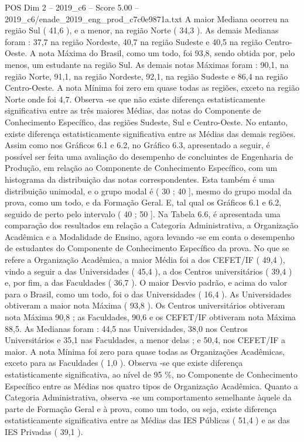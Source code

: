 \begin{textsample}{POS Dim 2 – 2019\_c6 – Score 5.00 – 2019\_c6/enade\_2019\_eng\_prod\_c7c0e9871a.txt}
A maior Mediana ocorreu na região Sul ( 41,6 ), e a menor, na região Norte ( 34,3 ).
As demais Medianas foram : 37,7 na região Nordeste, 40,7 na região Sudeste e 40,5 na região Centro-Oeste.
A nota Máxima do Brasil, como um todo, foi 93,8, sendo obtida por, pelo menos, um estudante na região Sul.
As demais notas Máximas foram : 90,1, na região Norte, 91,1, na região Nordeste, 92,1, na região Sudeste e 86,4 na região Centro-Oeste.
A nota Mínima foi zero em quase todas as regiões, exceto na região Norte onde foi 4,7.
Observa -se que não existe diferença estatisticamente significativa entre as três maiores Médias, das notas do Componente de Conhecimento Específico, das regiões Sudeste, Sul e Centro-Oeste.
No entanto, existe diferença estatisticamente significativa entre as Médias das demais regiões.
Assim como nos Gráficos 6.1 e 6.2, no Gráfico 6.3, apresentado a seguir, é possível ser feita uma avaliação do desempenho de concluintes de Engenharia de Produção, em relação ao Componente de Conhecimento Específico, com um histograma da distribuição das notas correspondentes.
Esta também é uma distribuição unimodal, e o grupo modal é ( 30 ; 40 ], mesmo do grupo modal da prova, como um todo, e da Formação Geral.
E, tal qual os Gráficos 6.1 e 6.2, seguido de perto pelo intervalo ( 40 ; 50 ].
Na Tabela 6.6, é apresentada uma comparação dos resultados em relação a Categoria Administrativa, a Organização Acadêmica e a Modalidade de Ensino, agora levando -se em conta o desempenho de estudantes do Componente de Conhecimento Específico da prova.
No que se refere a Organização Acadêmica, a maior Média foi a dos CEFET/IF ( 49,4 ), vindo a seguir a das Universidades ( 45,4 ), a dos Centros universitários ( 39,4 ) e, por fim, a das Faculdades ( 36,7 ).
O maior Desvio padrão, e acima do valor para o Brasil, como um todo, foi o das Universidades ( 16,4 ).
As Universidades obtiveram a maior nota Máxima ( 93,8 ).
Os Centros universitários obtiveram nota Máxima 90,8 ; as Faculdades, 90,6 e os CEFET/IF obtiveram nota Máxima 88,5.
As Medianas foram : 44,5 nas Universidades, 38,0 nos Centros Universitários e 35,1 nas Faculdades, a menor delas ; e 50,4, nos CEFET/IF a maior.
A nota Mínima foi zero para quase todas as Organizações Acadêmicas, exceto para as Faculdades ( 1,0 ).
Observa -se que existe diferença estatisticamente significativa, ao nível de 95 \%, no Componente de Conhecimento Específico entre as Médias nos quatro tipos de Organização Acadêmica.
Quanto a Categoria Administrativa, observa -se um comportamento semelhante àquele da parte de Formação Geral e à prova, como um todo, ou seja, existe diferença estatisticamente significativa entre as Médias das IES Públicas ( 51,4 ) e as das IES Privadas ( 39,1 ).

\end{textsample}
